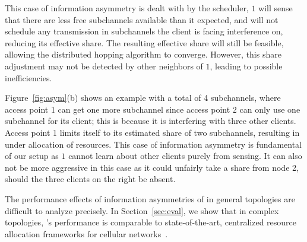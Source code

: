 This case of information asymmetry is dealt with by the scheduler, \eNB $1$ will sense that there are less free subchannels available than it expected, and will not schedule any transmission in subchannels the client is facing interference on, reducing its effective share. The resulting effective share will still be feasible, allowing the distributed hopping algorithm to converge. However, this share adjustment may not be detected by other neighbors of \eNB $1$, leading to possible inefficiencies.


 Figure~\ref{fig:asym}(b) shows an example with a total of 4 subchannels, where access point 1 can get one more subchannel since access point 2 can only use one subchannel for its client;
this is because it is interfering with three other clients. Access point 1 limits itself to its estimated share of two subchannels, resulting in under allocation of resources. 
This case of information asymmetry is fundamental of our setup as \eNB $1$ cannot learn about other clients purely from sensing. It can also not be more aggressive in this case as it could unfairly take a share 
from node 2, should the three clients on the right be absent. 

The performance effects of information asymmetries of \cf in general topologies are difficult to analyze precisely. 
In Section~\ref{sec:eval},
 we show that in complex topologies, \cf's performance is comparable to state-of-the-art, centralized resource allocation frameworks for cellular networks~\cite{fermi}.

